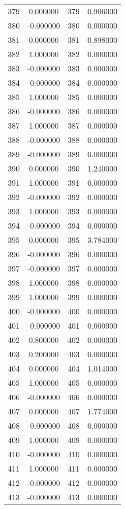 \documentclass[12pt]{article}
\begin{document}
\begin{longtable}{@{}cccc@{}}
379 & 0.000000 & 379 & 0.906000 \\
380 & -0.000000 & 380 & 0.000000 \\
381 & 0.000000 & 381 & 0.898000 \\
382 & 1.000000 & 382 & 0.000000 \\
383 & -0.000000 & 383 & 0.000000 \\
384 & -0.000000 & 384 & 0.000000 \\
385 & 1.000000 & 385 & 0.000000 \\
386 & -0.000000 & 386 & 0.000000 \\
387 & 1.000000 & 387 & 0.000000 \\
388 & -0.000000 & 388 & 0.000000 \\
389 & -0.000000 & 389 & 0.000000 \\
390 & 0.000000 & 390 & 1.240000 \\
391 & 1.000000 & 391 & 0.000000 \\
392 & -0.000000 & 392 & 0.000000 \\
393 & 1.000000 & 393 & 0.000000 \\
394 & -0.000000 & 394 & 0.000000 \\
395 & 0.000000 & 395 & 3.784000 \\
396 & -0.000000 & 396 & 0.000000 \\
397 & -0.000000 & 397 & 0.000000 \\
398 & 1.000000 & 398 & 0.000000 \\
399 & 1.000000 & 399 & 0.000000 \\
400 & -0.000000 & 400 & 0.000000 \\
401 & -0.000000 & 401 & 0.000000 \\
402 & 0.800000 & 402 & 0.000000 \\
403 & 0.200000 & 403 & 0.000000 \\
404 & 0.000000 & 404 & 1.014000 \\
405 & 1.000000 & 405 & 0.000000 \\
406 & -0.000000 & 406 & 0.000000 \\
407 & 0.000000 & 407 & 1.774000 \\
408 & -0.000000 & 408 & 0.000000 \\
409 & 1.000000 & 409 & 0.000000 \\
410 & -0.000000 & 410 & 0.000000 \\
411 & 1.000000 & 411 & 0.000000 \\
412 & -0.000000 & 412 & 0.000000 \\
413 & -0.000000 & 413 & 0.000000 \\

\end{longtable}
\end{document}
